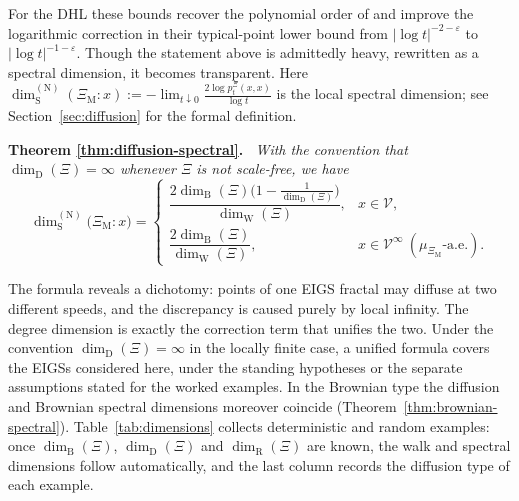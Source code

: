 \documentclass{article}
\newenvironment{restated}[1]{%
  \par\noindent\textbf{Theorem #1.}\itshape\ }%
  {\par}
\theoremstyle{plain}
\theoremstyle{definition}
\newcommand{\dimbox}{\dim_\mathrm{B}}
\newcommand{\dimdeg}{\dim_\mathrm{D}}
\newcommand{\dimwalk}{\dim_\mathrm{W}}
\newcommand{\dimresis}{\dim_\mathrm{R}}
\newcommand{\dimspec}{\dim_\mathrm{S}}
\begin{document}
For the DHL these bounds recover the polynomial order of \cite{hambly2010diffusion} and improve the logarithmic correction in their typical-point lower bound from $|\log t|^{-2-\varepsilon}$ to $|\log t|^{-1-\varepsilon}$.
Though the statement above is admittedly heavy,
rewritten as a spectral dimension, it becomes transparent.
Here $\dimspec^{(\mathrm N)}(\Xi_{\mathrm M}:x):=-\lim_{t\downarrow 0}\frac{2\log p_t^\Xi(x,x)}{\log t}$ is the local spectral dimension; see Section~\ref{sec:diffusion} for the formal definition.

\begin{restated}{\ref{thm:diffusion-spectral}}
With the convention that $\dimdeg(\Xi)=\infty$ whenever $\Xi$ is not scale-free, we have
\[
\dimspec^{(\mathrm N)}\bigl(\Xi_{\mathrm M}:x\bigr)
=
\begin{cases}
\dfrac{2\dimbox(\Xi)\bigl(1-\frac{1}{\dimdeg(\Xi)}\bigr)}{\dimwalk(\Xi)}, & x\in\mathscr V,\\[2ex]
\dfrac{2\dimbox(\Xi)}{\dimwalk(\Xi)}, & x\in\mathscr V^\infty\ (\mu_{\Xi_{\mathrm M}}\text{-a.e.}).
\end{cases}
\]
\end{restated}

The formula reveals a dichotomy: points of one EIGS fractal may diffuse at two different speeds, and the discrepancy is caused purely by local infinity.
The degree dimension is exactly the correction term that unifies the two. Under the convention $\dimdeg(\Xi)=\infty$ in the locally finite case, a unified formula covers the EIGSs considered here, under the standing hypotheses or the separate assumptions stated for the worked examples.
In the Brownian type the diffusion and Brownian spectral dimensions moreover coincide (Theorem~\ref{thm:brownian-spectral}).
Table~\ref{tab:dimensions} collects deterministic and random examples: once $\dimbox(\Xi)$, $\dimdeg(\Xi)$ and $\dimresis(\Xi)$ are known, the walk and spectral dimensions follow automatically, and the last column records the diffusion type of each example.
\end{document}

